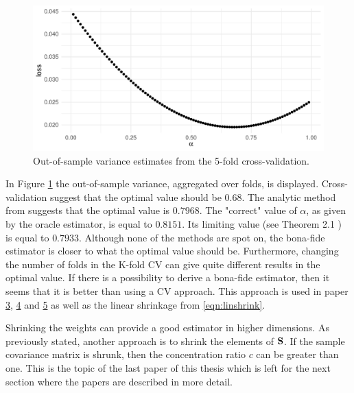 \documentclass[12pt, oneside]{book}\usepackage{knitr}
\begin{document}
{\begin{knitrout}\small
{}\color{fgcolor}\begin{figure}

{\centering \includegraphics[width=\maxwidth]{figure/cv_benchmark-1} 

}

\caption[Out-of-sample variance estimates from the 5-fold cross-validation]{Out-of-sample variance estimates from the 5-fold cross-validation.}\label{fig:cv_benchmark}
\end{figure}

\end{knitrout}

In Figure \ref{fig:cv_benchmark} the out-of-sample variance, aggregated over folds, is displayed. 
Cross-validation suggest that the optimal value should be $0.68$. 
The analytic method from \citet{bodnar2018estimation} suggests that the optimal value is $0.7968$.
The "correct" value of $\alpha$, as given by the oracle estimator, is equal to $0.8151$. 
Its limiting value (see Theorem 2.1 \citet{bodnar2018estimation}) is equal to $0.7933$.
Although none of the methods are spot on, the bona-fide estimator is closer to what the optimal value should be.
Furthermore, changing the number of folds in the K-fold CV can give quite different results in the optimal value.
If there is a possibility to derive a bona-fide estimator, then it seems that it is better than using a CV approach.
This approach is used in paper \hyperref[sec:paper3]{3}, \hyperref[sec:paper4]{4} and \hyperref[sec:paper5]{5} as well as the linear shrinkage from \eqref{eqn:linshrink}.

Shrinking the weights can provide a good estimator in higher dimensions. 
As previously stated, another approach is to shrink the elements of $\mathbf{S}$.
If the sample covariance matrix is shrunk, then the concentration ratio $c$ can be greater than one.
This is the topic of the last paper of this thesis which is left for the next section where the papers are described in more detail.

}
\end{document}

